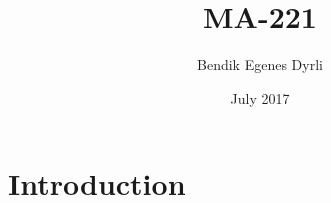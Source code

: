 \documentclass{article}
\title{MA-221}
\author{Bendik Egenes Dyrli}
\date{July 2017}
\begin{document}
\maketitle

\section{Introduction}
\end{document}

